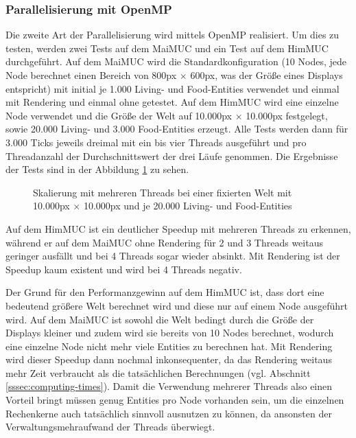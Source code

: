 \documentclass[course=erap]{aspdoc}
\begin{document}
\subsubsection{Parallelisierung mit OpenMP}
Die zweite Art der Parallelisierung wird mittels OpenMP realisiert. Um dies zu testen, werden zwei Tests auf dem MaiMUC und ein Test auf dem HimMUC durchgeführt. Auf dem MaiMUC wird die Standardkonfiguration (10 Nodes, jede Node berechnet einen Bereich von 800px $\times$ 600px, was der Größe eines Displays entspricht) mit initial je 1.000 Living- und Food-Entities verwendet und einmal mit Rendering und einmal ohne getestet. Auf dem HimMUC wird eine einzelne Node verwendet und die Größe der Welt auf 10.000px $\times$ 10.000px festgelegt, sowie 20.000 Living- und 3.000 Food-Entities erzeugt. Alle Tests werden dann für 3.000 Ticks jeweils dreimal mit ein bis vier Threads ausgeführt und pro Threadanzahl der Durchschnittswert der drei Läufe genommen. Die Ergebnisse der Tests sind in der Abbildung \ref{fig:thread-scaling} zu sehen.

\begin{figure}[h!]
\centering
{}
\caption{Skalierung mit mehreren Threads bei einer fixierten Welt mit 10.000px $\times$ 10.000px und je 20.000 Living- und Food-Entities}
\label{fig:thread-scaling}
\end{figure}

Auf dem HimMUC ist ein deutlicher Speedup mit mehreren Threads zu erkennen, während er auf dem MaiMUC ohne Rendering für 2 und 3 Threads weitaus geringer ausfällt und bei 4 Threads sogar wieder absinkt. Mit Rendering ist der Speedup kaum existent und wird bei 4 Threads negativ.

Der Grund für den Performanzgewinn auf dem HimMUC ist, dass dort eine bedeutend größere Welt berechnet wird und diese nur auf einem Node ausgeführt wird. Auf dem MaiMUC ist sowohl die Welt bedingt durch die Größe der Displays kleiner und zudem wird sie bereits von 10 Nodes berechnet, wodurch eine einzelne Node nicht mehr viele Entities zu berechnen hat. Mit Rendering wird dieser Speedup dann nochmal inkonsequenter, da das Rendering weitaus mehr Zeit verbraucht als die tatsächlichen Berechnungen (vgl. Abschnitt \ref{sssec:computing-times}). Damit die Verwendung mehrerer Threads also einen Vorteil bringt müssen genug Entities pro Node vorhanden sein, um die einzelnen Rechenkerne auch tatsächlich sinnvoll ausnutzen zu können, da ansonsten der Verwaltungsmehraufwand der Threads überwiegt.
\end{document}

